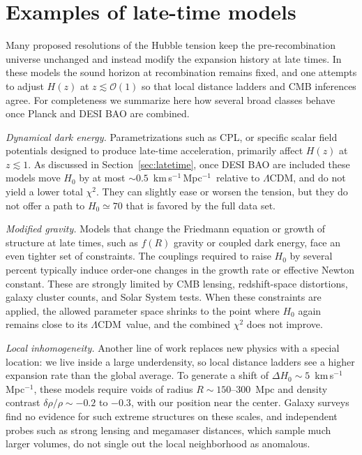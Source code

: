 \documentclass[twocolumn,showpacs,preprintnumbers,amsmath,amssymb,prd]{revtex4-2}
\newcommand{\lcdm}{$\Lambda$CDM}
\newcommand{\kms}{km\,s$^{-1}$\,Mpc$^{-1}$}
\begin{document}


\appendix

\section{Examples of late-time models}
\label{app:latetime}

Many proposed resolutions of the Hubble tension keep the pre-recombination universe 
unchanged and instead modify the expansion history at late times. In these models 
the sound horizon at recombination remains fixed, and one attempts to adjust $H(z)$ 
at $z \lesssim \mathcal{O}(1)$ so that local distance ladders and CMB inferences agree. 
For completeness we summarize here how several broad classes behave once Planck and 
DESI BAO are combined.

\emph{Dynamical dark energy.} Parametrizations such as CPL, or specific scalar 
field potentials designed to produce late-time acceleration, primarily affect 
$H(z)$ at $z \lesssim 1$. As discussed in Section~\ref{sec:latetime}, once DESI BAO 
are included these models move $H_0$ by at most $\sim 0.5$~\kms\ 
relative to \lcdm, and do not yield a lower total $\chi^2$. They can slightly ease 
or worsen the tension, but they do not offer a path to $H_0 \simeq 70$ that is 
favored by the full data set.

\emph{Modified gravity.} Models that change the Friedmann equation or growth of 
structure at late times, such as $f(R)$ gravity or coupled dark energy, face an 
even tighter set of constraints. The couplings required to raise $H_0$ by several 
percent typically induce order-one changes in the growth rate or effective Newton 
constant. These are strongly limited by CMB lensing, redshift-space distortions, 
galaxy cluster counts, and Solar System tests. When these constraints are applied, 
the allowed parameter space shrinks to the point where $H_0$ again remains close 
to its \lcdm\ value, and the combined $\chi^2$ does not improve.

\emph{Local inhomogeneity.} Another line of work replaces new physics with a 
special location: we live inside a large underdensity, so local distance ladders 
see a higher expansion rate than the global average. To generate a shift of 
$\Delta H_0 \sim 5$~\kms, these models require voids of radius 
$R \sim 150$--300~Mpc and density contrast $\delta\rho/\rho \sim -0.2$ to $-0.3$, 
with our position near the center. Galaxy surveys find no evidence for such extreme 
structures on these scales, and independent probes such as strong lensing and 
megamaser distances, which sample much larger volumes, do not single out the local 
neighborhood as anomalous.
\end{document}
